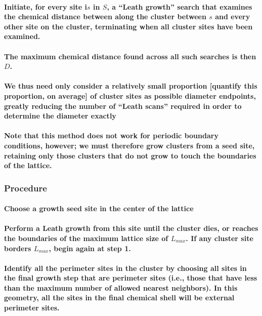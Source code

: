 \documentclass{umthesis}
\begin{document}
\paragraph{Initiate, for every site i$s$ in $S$, a ``Leath growth'' search that examines the chemical distance between along the cluster between $s$ and every other site on the cluster, terminating when all cluster sites have been examined.}
\label{sec-3.2.4.5.5}
\paragraph{The maximum chemical distance found across all such searches is then $D$.}
\label{sec-3.2.4.5.6}
\paragraph{We thus need only consider a relatively small proportion [quantify this proportion, on average] of cluster sites as possible diameter endpoints, greatly reducing the number of ``Leath scans'' required in order to determine the diameter exactly}
\label{sec-3.2.4.5.7}
\paragraph{Note that this method does not work for periodic boundary conditions, however; we must therefore grow clusters from a seed site, retaining only those clusters that do not grow to touch the boundaries of the lattice.}
\label{sec-3.2.4.5.8}
\subsubsection{Procedure}
\label{sec-3.2.4.6}
\paragraph{Choose a growth seed site in the center of the lattice}
\label{sec-3.2.4.6.1}
\paragraph{Perform a Leath growth from this site until the cluster dies, or reaches the boundaries of the maximum lattice size of $L_{max}$. If any cluster site borders $L_{max}$, begin again at step 1.}
\label{sec-3.2.4.6.2}
\paragraph{Identify all the perimeter sites in the cluster by choosing all sites in the final growth step that are perimeter sites (i.e., those that have less than the maximum number of allowed nearest neighbors).  In this geometry, all the sites in the final chemical shell will be external perimeter sites.}
\label{sec-3.2.4.6.3}
\end{document}
